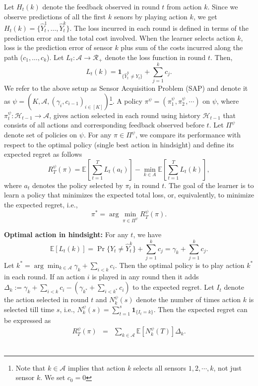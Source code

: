 \documentclass{article}
\begin{document}
Let $H_t(k)$ denote the feedback observed in round $t$ from action $k$. Since we observe predictions of all the first $k$ senors by playing action $k$, we get   $H_t(k)=\{\hat{Y}^1_t,\ldots,\hat{Y}^k_t\}$.
The loss incurred in each round is defined in terms of the prediction error and the total cost involved. When the learner selects action $k$, loss is the prediction error of sensor $k$ plus sum of the costs incurred along the path ($c_1,\ldots,c_k$). Let $L_t: \mathcal{A}\rightarrow \mathcal{R}_+$ denote the loss function in round $t$. Then,
\begin{equation}
L_t(k)=\mathbf{1}_{\{\hat{Y}^k_t\neq Y_t\}}+\sum_{j=1}^k c_j.
\end{equation} 
We refer to the above setup as Sensor Acquisition Problem (SAP) and denote it as $\psi=(K,\mathcal{A}, (\gamma_i,c_{i-1})_{i\in [K]})$\footnote{Note that $k\in \mathcal{A}$ implies that action $k$ selects all sensors ${1, 2, \cdots, k}$, not just sensor $k$. We set $c_0=0$}. A policy $\pi^\psi=(\pi^\psi_1, \pi^\psi_2, \cdots)$ on $\psi$, where  $\pi^\psi_t : \mathcal{H}_{t-1}\rightarrow
\mathcal{A}$, gives action selected in each round using history $\mathcal{H}_{t-1}$ that consists of all actions and corresponding feedback observed before $t$. Let $\Pi^\psi$ denote set of policies on $\psi$. For any $\pi \in \Pi^\psi$, we compare its performance with respect to the optimal policy (single best action in hindsight) and define its expected regret as follows
\begin{equation}
R^\psi_T(\pi)= \mathbb{E}\left[\sum_{t=1}^T L_t(a_t)\right]-\min_{k\in A}\mathbb{E}\left[\sum_{t=1}^T L_t(k)\right],
\end{equation}
where $a_t$ denotes the policy selected by $\pi_t$ in round $t$.
The goal of the learner is to learn a policy that minimizes the expected total loss, or, equivalently, to minimize the expected regret, i.e.,
\begin{equation}
\pi^*= \arg \min_{\pi \in \Pi^\psi } R^\psi_T(\pi).
\end{equation}

\noindent
{\bf Optimal action in hindsight: } For any $t$, we have 
\begin{equation}
\label{eqn:OptimalAction}
\mathbb{E}[L_t(k)]=\Pr\{Y_t\neq \hat{Y}^k_t\}+\sum_{j=1}^kc_j=\gamma_k +\sum_{j=1}^kc_j.
\end{equation}
Let $k^*=\arg\min_{k\in \mathcal{A}} \gamma_k + \sum_{i< k}c_i$. Then the optimal policy is to play action $k^*$ in each round. If an action $i$ is played in any round then it adds   $\Delta_k:=\gamma_k + \sum_{i<k}c_i -( \gamma_{k^*} + \sum_{i<k^*}c_i)$ to the expected regret. Let $I_t$ denote the action selected in round $t$ and $N^\psi_k(s)$ denote the number of times action $k$ is selected till time $s$, i.e., $N^\psi_k(s)=\sum_{t=1}^s \boldsymbol{1}_{\{I_t=k\}}$. Then the expected regret can be expressed as
\begin{eqnarray}
\label{eqn:ExpRegretGap}
R^\psi_T(\pi)&=& \sum_{k \in \mathcal{A}}\mathbb{E}[N_k^\psi(T)]\Delta_k.
\end{eqnarray}\
\end{document}
